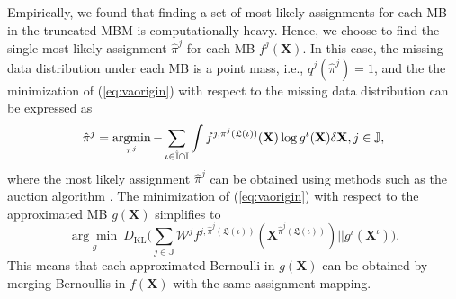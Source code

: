 \documentclass[journal]{IEEEtran}
\begin{document}
Empirically, we found that finding a set of most likely assignments for each MB in the truncated MBM is computationally heavy. Hence, we choose to find the single most likely assignment $\hat{\pi}^j$ for each MB $f^j(\mathbf{X})$. In this case, the missing data distribution under each MB is a point mass, i.e.,  $q^{j}(\hat{\pi}^{j})=1$, and the the minimization of (\ref{eq:vaorigin}) with respect to the missing data distribution can be expressed as
\begin{equation}
    \hat{\pi}^j = \operatornamewithlimits{argmin}_{\pi^j}-\sum_{\iota\in\hat{\mathbb{I}}\cap\mathbb{I}}\int f^{j,\pi^j(\mathfrak{L}(\iota))}(\mathbf{X})\log g^{\iota}(\mathbf{X})\delta \mathbf{X}, j\in\mathbb{J},
    \label{eq:estepoptimal}
\end{equation}
where the most likely assignment $\hat{\pi}^j$ can be obtained using methods such as the auction algorithm \cite{auction}. The minimization of (\ref{eq:vaorigin}) with respect to the approximated MB $g(\mathbf{X})$ simplifies to 
\begin{equation}
\underset{g}{\arg\min}~D_{\text{KL}} \bigg(  \sum_{j\in\mathbb{J}}\mathcal{W}^jf^{j,\hat{\pi}^j(\mathfrak{L}(\iota))}(\mathbf{X}^{\hat{\pi}^j(\mathfrak{L}(\iota))}) ||g^{\iota}(\mathbf{X}^{\iota}) \bigg).
\label{eq:mstepop}
\end{equation}
This means that each approximated Bernoulli in $g(\mathbf{X})$ can be obtained by merging Bernoullis in $f(\mathbf{X})$ with the same assignment mapping. 

\end{document}
